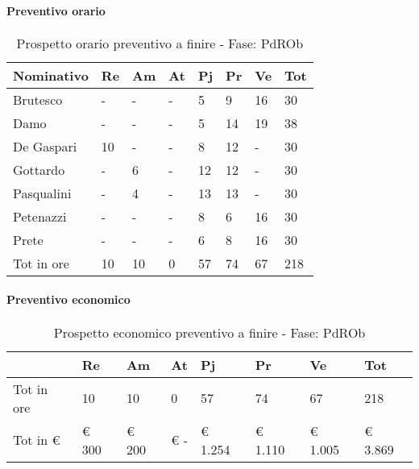 			\paragraph{Preventivo orario}
											\begin{table}[H] \begin{center} \begin{tabular}{llllllll}
											\toprule
											\textbf{Nominativo}	&	\textbf{Re}	&	\textbf{Am}	&	\textbf{At}	&	\textbf{Pj}	&	\textbf{Pr}	&	\textbf{Ve}	&	\textbf{Tot}	 \\
											\midrule
											Brutesco	&	-	&	-	&	-	&	5	&	9	&	16	&	30	 \\
											Damo	&	-	&	-	&	-	&	5	&	14	&	19	&	38	 \\
											De Gaspari	&	10	&	-	&	-	&	8	&	12	&	-	&	30	 \\
											Gottardo	&	-	&	6	&	-	&	12	&	12	&	-	&	30	 \\
											Pasqualini	&	-	&	4	&	-	&	13	&	13	&	-	&	30	 \\
											Petenazzi	&	-	&	-	&	-	&	8	&	6	&	16	&	30	 \\
											Prete	&	-	&	-	&	-	&	6	&	8	&	16	&	30	 \\
											\midrule
											Tot in ore	&	10	&	10	&	0	&	57	&	74	&	67	&	218	 \\

											\bottomrule
											\end{tabular} \end{center} \caption{Prospetto orario preventivo a finire - Fase:
											PdROb
											} \end{table}

				\paragraph{Preventivo economico}
											\begin{table}[H] \begin{center} \begin{tabular}{llllllll}
											\toprule
												&	\textbf{Re}	&	\textbf{Am}	&	\textbf{At}	&	\textbf{Pj}	&	\textbf{Pr}	&	\textbf{Ve}	&	\textbf{Tot}	 \\

											\midrule
											Tot in ore	&	10	&	10	&	0	&	57	&	74	&	67	&	218	 \\


											Tot in €	&	 €           300 	 & 	 €        200 	 & 	 €               -   	 & 	 €    1.254 	 & 	 €        1.110 	 & 	 €    1.005 	 & 	 €              3.869 	 \\
											\bottomrule
											\end{tabular} \end{center} \caption{Prospetto economico preventivo a finire - Fase:
											PdROb
											} \end{table}
